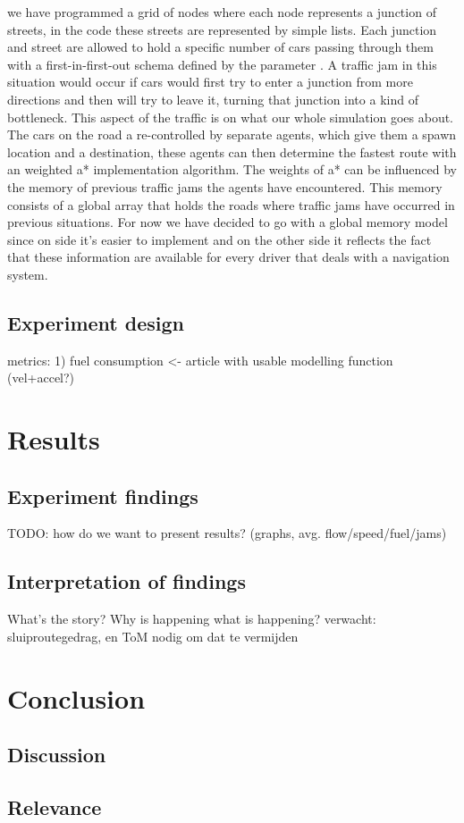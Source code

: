 \documentclass[a4paper,hidelinks]{article}
\begin{document}
 we have programmed a grid of nodes where each node represents a junction of streets, in the code these streets are represented by simple lists. Each junction and street are allowed to hold a specific number of cars passing through them with a first-in-first-out schema defined by the parameter . A traffic jam in this situation would occur if cars would first try to enter a junction from more directions and then will try to leave it, turning that junction into a kind of bottleneck. This aspect of the traffic is on what our whole simulation goes about. The cars on the road a re-controlled by separate agents, which give them a spawn location and a destination, these agents can then determine the fastest route with an weighted a* implementation algorithm. The weights of a* can be influenced by the memory of previous traffic jams the agents have encountered. This memory consists of a global array that holds the roads where traffic jams have occurred in previous situations. For now we have decided to go with a global memory model since on side it's easier to implement and on the other side it reflects the fact that these information are available for every driver that deals with a navigation system. 

\subsection{Experiment design}
metrics: 1) fuel consumption <- article with usable modelling function (vel+accel?)

\section{Results}
\subsection{Experiment findings}
TODO: how do we want to present results? (graphs, avg. flow/speed/fuel/jams)

\subsection{Interpretation of findings}
What's the story? Why is happening what is happening? verwacht: sluiproutegedrag, en ToM nodig om dat te vermijden

\section{Conclusion}
\subsection{Discussion}
\subsection{Relevance}




\end{document}
